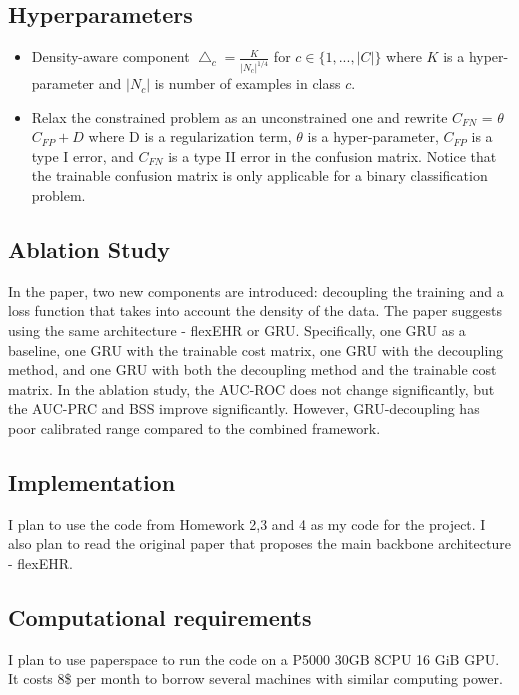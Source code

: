 \documentclass[11pt,a4paper]{article}
\begin{document}
\subsection{Hyperparameters}
\begin{itemize}
\item Density-aware component $\bigtriangleup_c = \frac{K}{|N_c|^{1/4}}$ for $c \in \{1,...,|C|\}$
where $K$ is a hyper-parameter and $|N_c|$ is number of examples in class $c$.

\item Relax the constrained problem as an unconstrained one and rewrite $C_{FN}$ = $\theta$ $C_{FP} + D $ where D is a regularization term, $\theta$ is a hyper-parameter, $C_{FP}$ is a type I error, and $C_{FN}$ is a type II error in the confusion matrix. Notice that the trainable confusion matrix is only applicable for a binary classification problem. 
\end{itemize}

\subsection{Ablation Study}
In the paper, two new components are introduced: decoupling the training and a loss function that takes into account the density of the data. The paper suggests using the same architecture - flexEHR or GRU. Specifically, one GRU as a baseline, one GRU with the trainable cost matrix, one GRU with the decoupling method, and one GRU with both the decoupling method and the trainable cost matrix. In the ablation study, the AUC-ROC does not change significantly, but the AUC-PRC and BSS improve significantly. However, GRU-decoupling has poor calibrated range compared to the combined framework.  

\subsection{Implementation}
I plan to use the code from Homework 2,3 and 4 as my code for the project. I also plan to read the original paper that proposes the main backbone architecture - flexEHR. 

\subsection{Computational requirements}
I plan to use paperspace to run the code on a P5000 30GB 8CPU 16 GiB GPU. It costs 8\$ per month to borrow several machines with similar computing power. 
\end{document}
